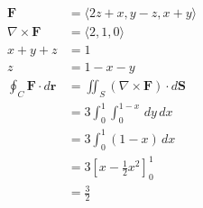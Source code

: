 \documentclass{article}
\begin{document}
\begin{align*}
  \mathbf{F}                            & = \langle 2 z + x, y - z, x + y \rangle                 \\
  \nabla \times \mathbf{F}              & = \langle 2, 1, 0 \rangle                               \\
  x + y + z                             & = 1                                                     \\
  z                                     & = 1 - x - y                                             \\
  \oint_C \mathbf{F} \cdot d \mathbf{r} & = \iint_S (\nabla \times \mathbf{F}) \cdot d \mathbf{S} \\
                                        & = 3 \int_0^1 \int_0^{1 - x} \,dy \,dx                   \\
                                        & = 3 \int_0^1 (1 - x) \,dx                               \\
                                        & = 3 \left[ x - \frac{1}{2} x^2 \right]_0^1              \\
                                        & = \frac{3}{2}
\end{align*}

\setcounter{subsubsection}{6}
\subsubsection{}
\end{document}

